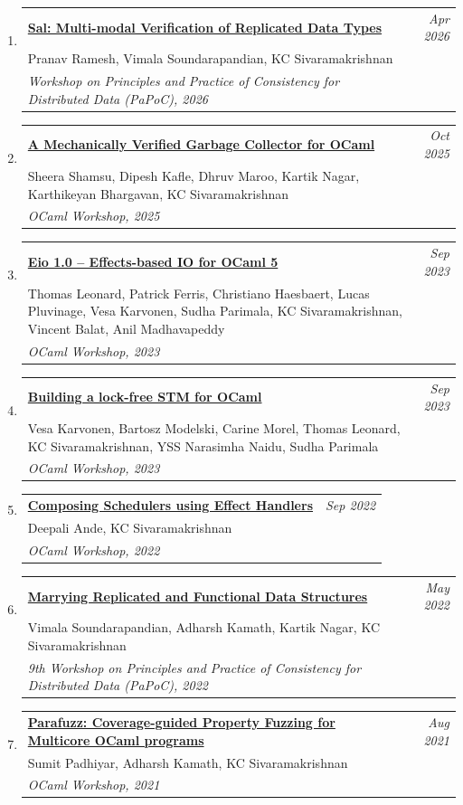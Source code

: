 \documentclass[10pt]{article}
\makeatletter
\newcommand{\lbar}[1]{{\color{#1}\ding{118}}\hspace*{2pt}}
\newenvironment{benumerate}[2]{
    \let\oldItem\item
    \def\item{\addtocounter{enumi}{-2}\oldItem}
    \begin{enumerate}[#2] \itemsep3pt
    \setcounter{enumi}{#1}
    \addtocounter{enumi}{1}}
  {\end{enumerate}}
\newenvironment{publication}[5]
{ \item
  \begin{tabular*}{7.5in}{p{6.3in}@{\extracolsep{\fill}}r}
    \href{#1}{\textbf{#2}} & \textit{#3}\\ #4 &\\ \textit{#5}&\\
  \end{tabular*}
} {}
\newenvironment{region}[3]{%
  \Needspace{7\baselineskip}
  \vspace*{0.5ex}
  {\scalebox{1.4}{\textbf{#1}}}
  \begin{benumerate}{#3}{\color{RoyalBlue}#2}}
  {\end{benumerate}\vspace{0.8ex}}
\makeatother
\begin{document}
\begin{region} {\lbar{purple}Workshop Publications}{{W}1}{26}

	\begin{publication}{https://kcsrk.info/papers/sal_jan26.pdf}
		{Sal: Multi-modal Verification of Replicated Data Types}
		{Apr 2026}{Pranav Ramesh, Vimala Soundarapandian, KC Sivaramakrishnan}
		{Workshop on Principles and Practice of Consistency for Distributed Data (PaPoC), 2026}
	\end{publication}

	\begin{publication}{https://kcsrk.info/papers/ocaml_oct25.pdf}
		{A Mechanically Verified Garbage Collector for OCaml}
		{Oct 2025}{Sheera Shamsu, Dipesh Kafle, Dhruv Maroo, Kartik Nagar, Karthikeyan Bhargavan, KC Sivaramakrishnan}
		{OCaml Workshop, 2025}
	\end{publication}

  \begin{publication}{https://kcsrk.info/papers/eio_ocaml23a.pdf}
		{Eio 1.0 – Effects-based IO for OCaml 5}
    {Sep 2023}{Thomas Leonard, Patrick Ferris, Christiano Haesbaert, Lucas Pluvinage, Vesa Karvonen, Sudha Parimala, KC Sivaramakrishnan, Vincent Balat, Anil Madhavapeddy}
		{OCaml Workshop, 2023}
	\end{publication}

  \begin{publication}{https://kcsrk.info/papers/kcas_ocaml23b.pdf}
    {Building a lock-free STM for OCaml}
    {Sep 2023}{Vesa Karvonen, Bartosz Modelski, Carine Morel, Thomas Leonard, KC Sivaramakrishnan, YSS Narasimha Naidu, Sudha Parimala}
		{OCaml Workshop, 2023}
	\end{publication}

	\begin{publication}{https://kcsrk.info/papers/compose_ocaml22.pdf}
		{Composing Schedulers using Effect Handlers}
		{Sep 2022}{Deepali Ande, KC Sivaramakrishnan}
		{OCaml Workshop, 2022}
	\end{publication}

	\begin{publication}{https://kcsrk.info/papers/papoc22.pdf}
		{Marrying Replicated and Functional Data Structures}
		{May 2022}{Vimala Soundarapandian, Adharsh Kamath, Kartik Nagar, KC Sivaramakrishnan}
		{9th Workshop on Principles and Practice of Consistency for Distributed Data (PaPoC), 2022}
	\end{publication}

	\begin{publication}{https://kcsrk.info/papers/ocaml2021a.pdf}
		{Parafuzz: Coverage-guided Property Fuzzing for Multicore OCaml programs}
		{Aug 2021}{Sumit Padhiyar, Adharsh Kamath, KC Sivaramakrishnan}
		{OCaml Workshop, 2021}
	\end{publication}


\end{region}
\end{document}
